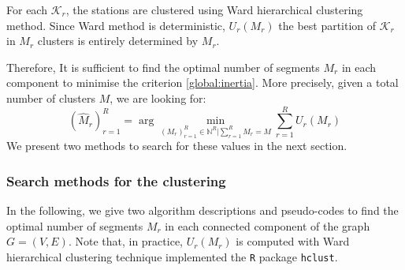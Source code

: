 For each $\mathcal{K}_r$, the stations are clustered using Ward hierarchical clustering method. Since Ward method is deterministic, $U_r(M_r)$ the best partition of $\mathcal{K}_r$ in $M_r$ clusters is entirely determined by $M_r$. 

Therefore, It is sufficient to find the optimal number of segments $M_r$ in each component to minimise the criterion \eqref{global:inertia}. More precisely, given a total number of clusters $M$, we are looking for: 
\begin{equation}\label{chp:5:estim:clust}
(\widehat{M}_r)_{r=1}^R = \arg\min_{(M_r)_{r=1}^R\in\mathbb{N}^R\vert \sum_{r=1}^R M_r = M}\sum_{r=1}^RU_r(M_r) 
\end{equation}
We present two methods to search for these values in the next section.




\subsubsection{Search methods for the clustering}  

In the following, we give two algorithm descriptions and pseudo-codes to find the optimal number of segments $M_r$ in each connected component of the graph $G = (V,E)$. Note that, in practice, $U_r(M_r)$ is computed with Ward hierarchical clustering technique implemented the \texttt{R} package \texttt{hclust}. 

